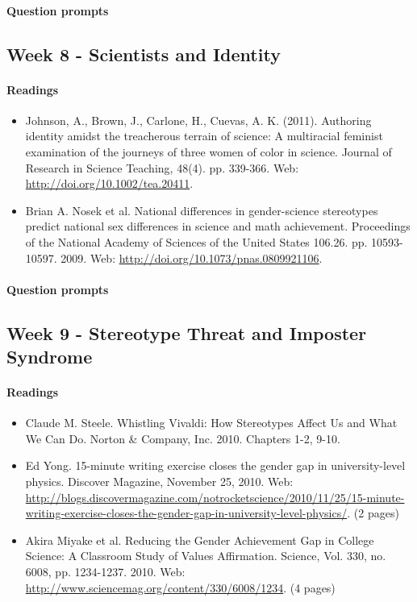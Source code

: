 \documentclass{article}
\begin{document}
\paragraph{Question prompts}


\subsection{Week 8 - Scientists and Identity }
\paragraph{Readings}
\begin{itemize}
\item Johnson, A., Brown, J., Carlone, H., Cuevas, A. K. (2011). Authoring identity amidst the treacherous terrain of science: A multiracial feminist examination of the  journeys of three women of color in science. Journal of Research in Science Teaching, 48(4).  pp. 339-366. Web: \url{http://doi.org/10.1002/tea.20411}.
\item Brian A. Nosek et al. National differences in gender-science stereotypes predict national sex differences in science and math achievement. Proceedings of the National Academy of Sciences of the United States 106.26. pp. 10593-10597. 2009. Web: \url{http://doi.org/10.1073/pnas.0809921106}.
\end{itemize}
\paragraph{Question prompts}


\subsection{Week 9 - Stereotype Threat and Imposter Syndrome}
\paragraph{Readings}
\begin{itemize}
\item Claude M. Steele. Whistling Vivaldi: How Stereotypes Affect Us and What We Can Do. Norton \& Company, Inc. 2010. Chapters 1-2, 9-10.
\item Ed Yong. 15-minute writing exercise closes the gender gap in university-level physics. Discover Magazine, November 25, 2010. Web: \url{http://blogs.discovermagazine.com/notrocketscience/2010/11/25/15-minute-writing-exercise-closes-the-gender-gap-in-university-level-physics/}. (2 pages)
\item Akira Miyake et al. Reducing the Gender Achievement Gap in College Science: A Classroom Study of Values Affirmation. Science, Vol. 330, no. 6008, pp. 1234-1237. 2010. Web: \url{http://www.sciencemag.org/content/330/6008/1234}. (4 pages)
\end{itemize}
\end{document}
